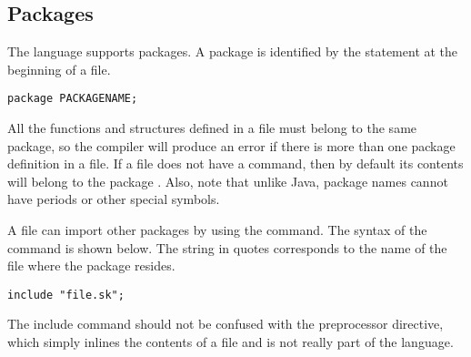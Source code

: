 \subsection{Packages}

The \Sk{} language supports packages. A package is identified by the  statement at the beginning of a file.
\begin{lstlisting}
package PACKAGENAME;
\end{lstlisting}

All the functions and structures defined in a file must belong to the same package, so the compiler will produce an error if there is more than one package definition in a file. If a file does not have a  command, then by default its contents will belong to the package . Also, note that unlike Java, package names cannot have periods or other special symbols.

A file can import other packages by using the  command. The syntax of the command is shown below. The string in quotes corresponds to the name of the file where the package resides.

\begin{lstlisting}
include "file.sk";
\end{lstlisting}

The include command should not be confused with the  preprocessor directive, which simply inlines the contents of a file and is not really part of the language.


